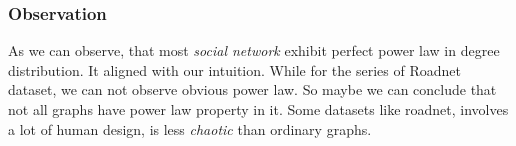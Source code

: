 \subsubsection{Observation}
As we can observe, that most \emph{social network} exhibit perfect power law in degree distribution. It aligned with our intuition. While for the series of Roadnet dataset, we can not observe obvious power law. So maybe we can conclude that not all graphs have power law property in it. Some datasets like roadnet, involves a lot of human design, is less \emph{chaotic} than ordinary graphs.
